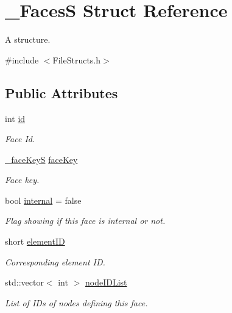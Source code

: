 \hypertarget{struct___faces_s}{}\section{\+\_\+\+FacesS Struct Reference}
\label{struct___faces_s}


A structure.  




{\ttfamily \#include $<$File\+Structs.\+h$>$}

\subsection*{Public Attributes}
\begin{DoxyCompactItemize}
\item 
int \hyperlink{struct___faces_s_a7365ff5c5951b2a61ef5e4411b0d521a}{id}
\begin{DoxyCompactList}\small\item\em Face Id. \end{DoxyCompactList}\item 
\hyperlink{_file_structs_8h_a3f1328036ba69b8a38f4d1743a5c8742}{\+\_\+face\+KeyS} \hyperlink{struct___faces_s_a0b72e5930902a49f376d035d654ecef8}{face\+Key}
\begin{DoxyCompactList}\small\item\em Face key. \end{DoxyCompactList}\item 
bool \hyperlink{struct___faces_s_a5ce239e336aea528dad6008a6f2909f0}{internal} = false
\begin{DoxyCompactList}\small\item\em Flag showing if this face is internal or not. \end{DoxyCompactList}\item 
short \hyperlink{struct___faces_s_a430ed7b14ef236bea40b0a9be2801c94}{element\+ID}
\begin{DoxyCompactList}\small\item\em Corresponding element ID. \end{DoxyCompactList}\item 
std\+::vector$<$ int $>$ \hyperlink{struct___faces_s_a1af35bd658b7be0f98e09deb5f8b3ead}{node\+I\+D\+List}
\begin{DoxyCompactList}\small\item\em List of I\+Ds of nodes defining this face. \end{DoxyCompactList}\end{DoxyCompactItemize}


